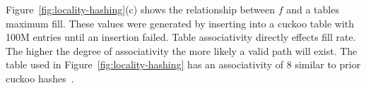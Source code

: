 
Figure~\ref{fig:locality-hashing}(c) shows the relationship
between $f$ and a tables maximum fill. These values were
generated by inserting into a cuckoo table with 100M entries
until an insertion failed. Table associativity directly
effects fill rate. The higher the degree of associativity
the more likely a valid path will exist. The table used in
Figure~\ref{fig:locality-hashing} has an associativity of 8
similar to prior cuckoo
hashes~\cite{memc3,cuckoo-improvements,pilaf}.







